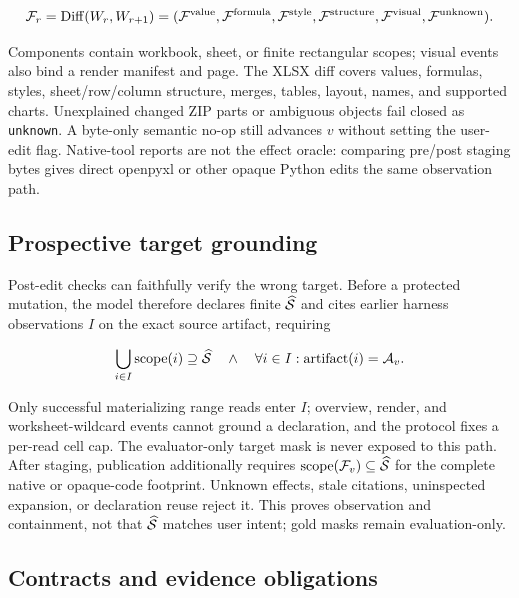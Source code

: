 \begin{equation}
  \mathcal{F}_r = \operatorname{Diff}(W_r,W_{r+1})
  = (\mathcal{F}^{\mathrm{value}},\mathcal{F}^{\mathrm{formula}},
     \mathcal{F}^{\mathrm{style}},\mathcal{F}^{\mathrm{structure}},
     \mathcal{F}^{\mathrm{visual}},\mathcal{F}^{\mathrm{unknown}}).
\end{equation}

Components contain workbook, sheet, or finite rectangular scopes; visual events
also bind a render manifest and page. The XLSX diff covers values, formulas,
styles, sheet/row/column structure, merges, tables, layout, names, and supported
charts. Unexplained changed ZIP parts or ambiguous objects fail closed as
\texttt{unknown}. A byte-only semantic no-op still advances $v$ without setting
the user-edit flag. Native-tool reports are not the effect oracle: comparing
pre/post staging bytes gives direct openpyxl or other opaque Python edits the
same observation path.

\subsection{Prospective target grounding}

Post-edit checks can faithfully verify the wrong target. Before a protected
mutation, the model therefore declares finite $\widehat{\mathcal{S}}$ and cites
earlier harness observations $I$ on the exact source artifact, requiring

\begin{equation}
  \bigcup_{i\in I}\operatorname{scope}(i)\supseteq\widehat{\mathcal{S}}
  \quad\land\quad
  \forall i\in I:\operatorname{artifact}(i)=\mathcal{A}_v.
\end{equation}

Only successful materializing range reads enter $I$; overview, render, and
worksheet-wildcard events cannot ground a declaration, and the protocol fixes a
per-read cell cap. The evaluator-only target mask is never exposed to this path.
After staging, publication additionally requires
$\operatorname{scope}(\mathcal{F}_v)\subseteq\widehat{\mathcal{S}}$ for the complete
native or opaque-code footprint. Unknown effects, stale citations, uninspected
expansion, or declaration reuse reject it. This proves observation and
containment, not that $\widehat{\mathcal{S}}$ matches user intent; gold masks remain
evaluation-only.

\subsection{Contracts and evidence obligations}

